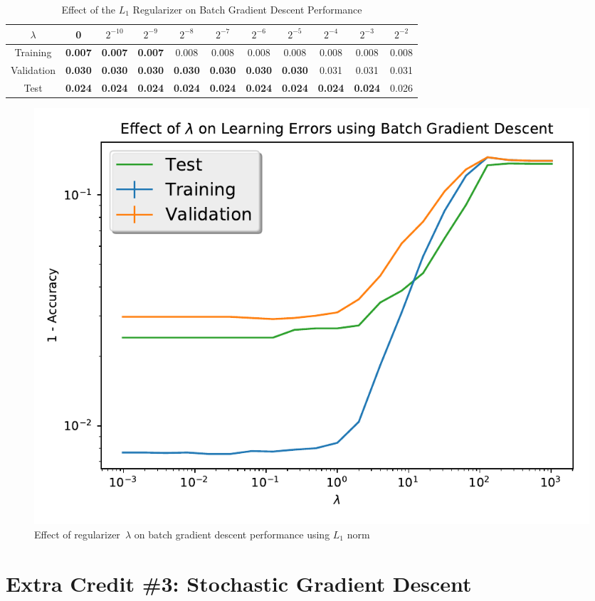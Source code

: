 \documentclass{report}
\begin{document}
  \begin{table}[]
    \centering
    \caption{Effect of the $L_1$ Regularizer on Batch Gradient Descent Performance}
    \label{tab:batchGradientDescentL1}
    \begin{tabular}{c||c|c|c|c|c|c|c|c|c|c}
      \hline
      $\lambda$  & 0              & $2^{-10}$ & $2^{-9}$ & $2^{-8}$       & $2^{-7}$ & $2^{-6}$ & $2^{-5}$ & $2^{-4}$ & $2^{-3}$ & $2^{-2}$ \\ \hline
      Training   & \textbf{0.007} & \textbf{0.007}     & \textbf{0.007}    & 0.008 & 0.008    & 0.008    & 0.008    & 0.008    & 0.008    & 0.008    \\ \hline
      Validation & \textbf{0.030} & \textbf{0.030}    & \textbf{0.030}    & \textbf{0.030} & \textbf{0.030}    & \textbf{0.030}    & \textbf{0.030}    & 0.031    & 0.031    & 0.031    \\ \hline
      Test       & \textbf{0.024} & \textbf{0.024}     & \textbf{0.024}    & \textbf{0.024} & \textbf{0.024}    & \textbf{0.024}    & \textbf{0.024}    & \textbf{0.024}    & \textbf{0.024}    & 0.026    \\ \hline
    \end{tabular}
  \end{table}


  \begin{figure}
    \centering
    \includegraphics[scale=.5]{batch_GD_L1Norm}
    \caption{Effect of regularizer~$\lambda$ on batch gradient descent performance using $L_1$ norm}\label{fig:batchGdL1}
  \end{figure}

  \section{Extra Credit \#3: Stochastic Gradient Descent}
  
\end{document}
